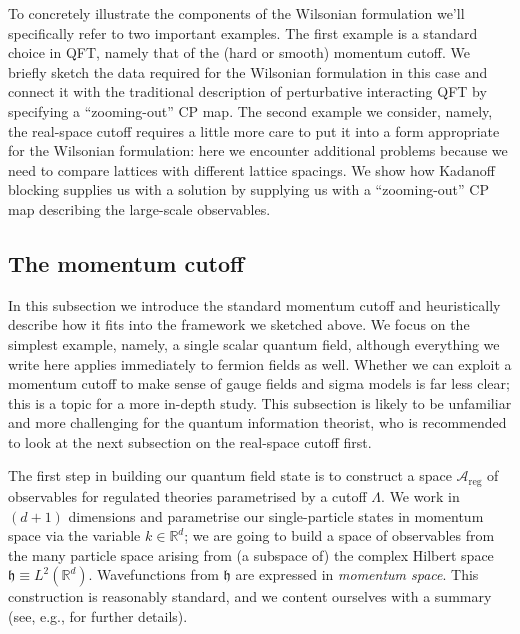 \documentclass[11pt]{amsart}
\theoremstyle{plain}%
\theoremstyle{definition}
\theoremstyle{remark}
\begin{document}
To concretely illustrate the components of the Wilsonian formulation we'll specifically refer to two important examples. The first example is a standard choice in QFT, namely that of the (hard or smooth) momentum cutoff. We briefly sketch the data required for the Wilsonian formulation in this case and connect it with the traditional description of perturbative interacting QFT by specifying a ``zooming-out'' CP map. The second example we consider, namely, the real-space cutoff requires a little more care to put it into a form appropriate for the Wilsonian formulation: here we encounter additional problems because we need to compare lattices with different lattice spacings. We show how Kadanoff blocking supplies us with a solution by supplying us with a ``zooming-out'' CP map describing the large-scale observables. 

\subsection{The momentum cutoff}
In this subsection we introduce the standard momentum cutoff and heuristically describe how it fits into the framework we sketched above. We focus on the simplest example, namely, a single scalar quantum field, although everything we write here applies immediately to fermion fields as well. Whether we can exploit a momentum cutoff to make sense of gauge fields and sigma models is far less clear; this is a topic for a more in-depth study. This subsection is likely to be unfamiliar and more challenging for the quantum information theorist, who is recommended to look at the next subsection on the real-space cutoff first. 

The first step in building our quantum field state is to construct a space $\mathcal{A}_{\text{reg}}$ of observables for regulated theories parametrised by a cutoff $\Lambda$. We work in $(d+1)$ dimensions and parametrise our single-particle states in momentum space via the variable $k\in\mathbb{R}^d$; we are going to build a space of observables from the many particle space arising from (a subspace of) the complex Hilbert space $\mathfrak{h} \equiv L^2(\mathbb{R}^d)$. Wavefunctions from $\mathfrak{h}$ are expressed in \emph{momentum space}. This construction is reasonably standard, and we content ourselves with a summary (see, e.g., \cite{bratteli_operator_1997} for further details). 
\end{document}
